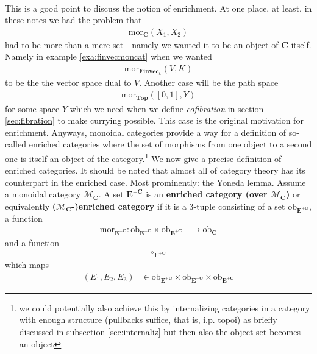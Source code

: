 \\
This is a good point to discuss the notion of {\glqq}enrichment{\grqq}. At one place, at least, in these notes we had the problem that
\begin{align*}
  \mathrm{mor}_{\mathbf{C}}(X_{1},X_{2})
\end{align*}
had to be more than a mere set - namely we wanted it to be an object of $\mathbf{C}$ itself. Namely in example \ref{exa:finvecmoncat} when we wanted
\begin{align*}
  \mathrm{mor}_{\mathbf{Finvec}_{k}}(V,K)
\end{align*}
to be the the vector space dual to $V$. Another case will be the path space
\begin{align*}
  \mathrm{mor}_{\mathbf{Top}}([0,1],Y)
\end{align*}
for some space $Y$ which we need when we define \textit{cofibration} in section \ref{sec:fibration} to make currying possible. This case is the original motivation for enrichment. Anyways, monoidal categories provide a way for a definition of so-called enriched categories where the set of morphisms from one object to a second one is itself an object of the category.\footnote{we could potentially also achieve this by internalizing categories in a category with enough structure (pullbacks suffice, that is, i.p. topoi) as briefly discussed in subsection \ref{sec:internaliz} but then also the object set becomes an object} We now give a precise definition of enriched categories. It should be noted that almost all of category theory has its counterpart in the enriched case. Most prominently: the Yoneda lemma. Assume a monoidal category $\mathcal{M}_{\mathbf{C}}$. A set $\mathbf{E}^{+\mathbf{C}}$ is an \textbf{enriched category (over $\mathcal{M}_{\mathbf{C}}$)} or equivalently \textbf{($\mathcal{M}_{\mathbf{C}}$-)enriched category} if it is a $3$-tuple consisting of a set $\mathrm{ob}_{\mathbf{E}^{+\mathbf{C}}}$, a function
\begin{align*}
  \mathrm{mor}_{\mathbf{E}^{+\mathbf{C}}}
  \colon
  \mathrm{ob}_{\mathbf{E}^{+\mathbf{C}}}
  \times
  \mathrm{ob}_{\mathbf{E}^{+\mathbf{C}}}
  &\rightarrow
  \mathrm{ob}_{\mathbf{C}}
\end{align*}
and a function
\begin{align*}
  \circ_{\mathbf{E}^{+\mathbf{C}}}
\end{align*}
which maps
\begin{align*}
  (E_{1},E_{2},E_{3})
  &\in
  \mathrm{ob}_{\mathbf{E}^{+\mathbf{C}}}
  \times
  \mathrm{ob}_{\mathbf{E}^{+\mathbf{C}}}
  \times
  \mathrm{ob}_{\mathbf{E}^{+\mathbf{C}}}
\end{align*}
